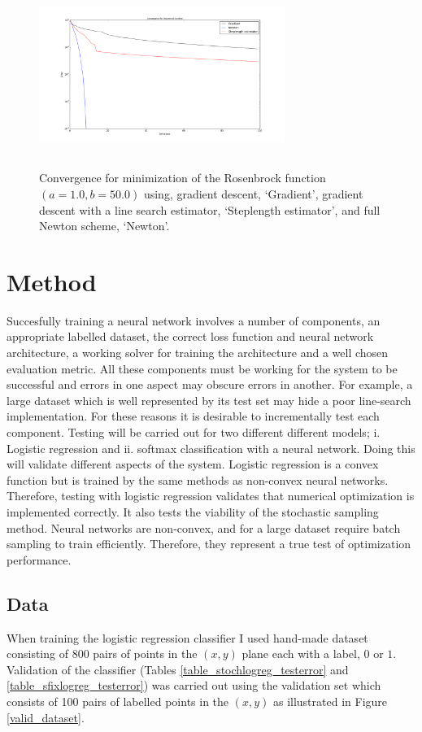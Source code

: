 \documentclass[11pt,twocolumn]{article}
\begin{document}
\begin{figure}[!ht]
\centering
\includegraphics[height=6cm, width=8cm]{../src-rosen/Rosenbrock_convergence.png}
\caption{Convergence for minimization of the Rosenbrock function $(a=1.0, b=50.0)$ using, gradient descent, `Gradient', gradient descent with a line search estimator, `Steplength estimator', and full Newton scheme, `Newton'.}\label{Rosenbrock_conv1}
\end{figure}

\section{Method}
Succesfully training a neural network involves a number of components, an appropriate labelled dataset, the correct loss function and neural network architecture, a working solver for training the architecture and a well chosen evaluation metric.  All these components must be working for the system to be successful and errors in one aspect may obscure errors in another. For example, a large dataset which is well represented by its test set may hide a poor line-search implementation. For these reasons it is desirable to incrementally test each component. Testing will be carried out for two different different models; i. Logistic regression and ii. softmax classification with a neural network. Doing this will validate different aspects of the system. Logistic regression is a convex function but is trained by the same methods as non-convex neural networks. Therefore, testing with logistic regression validates that numerical optimization is implemented correctly. It also tests the viability of the stochastic sampling method. Neural networks are non-convex, and for a large dataset require batch sampling to train efficiently. Therefore, they represent a true test of optimization performance. 

\subsection{Data} 
When training the logistic regression classifier I used hand-made dataset consisting of 800 pairs of points in the $(x,y)$ plane each with a label, $0$ or $1$. Validation of the classifier (Tables \ref{table_stochlogreg_testerror} and \ref{table_sfixlogreg_testerror}) was carried out using the validation set which consists of 100 pairs of labelled points in the $(x,y)$ as illustrated in Figure \ref{valid_dataset}.
\end{document}

